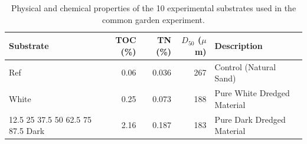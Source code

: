 \begin{table}[htbp]
\centering
\caption{Physical and chemical properties of the 10 experimental substrates used in the common garden experiment.}
\label{tab:substrate_summary}
\small
\begin{tabular}{l r r r l}
\toprule
Substrate & TOC (\%) & TN (\%) & $D_{50}$ ($\mu$m) & Description \\
\midrule
Ref          & 0.06 & 0.036 & 267 & Control (Natural Sand) \\
White        & 0.25 & 0.073 & 188 & Pure White Dredged Material \\
12.5%
25%
37.5%
50%
62.5%
75%
87.5%
Dark         & 2.16 & 0.187 & 183 & Pure Dark Dredged Material \\
\bottomrule
\end{tabular}
\end{table}
